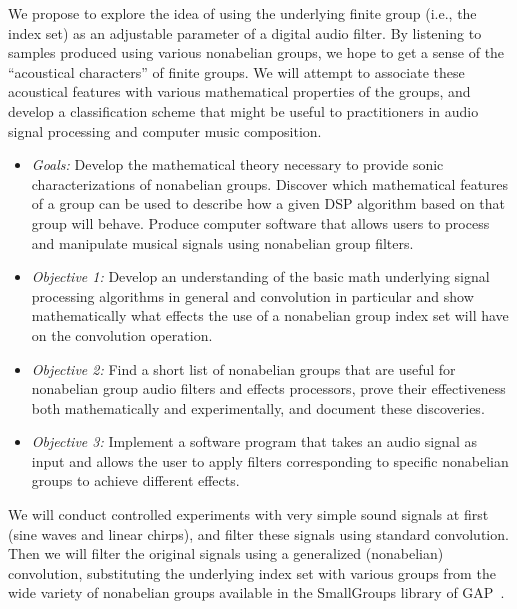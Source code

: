 \documentclass[11pt]{article}
\begin{document}
\vskip5mm


We propose to explore the idea of using the underlying finite group (i.e., the
index set) as an adjustable parameter of a digital audio filter.  By listening to
samples produced using various nonabelian groups, we hope to get a sense of the
``acoustical characters'' of finite groups.  We will attempt to associate these
acoustical features with various mathematical properties of the groups, and
develop a classification scheme that might be useful to
practitioners in audio signal processing and computer music composition.

\begin{itemize}
\item {\it Goals:}
Develop the mathematical theory necessary to provide sonic characterizations of
nonabelian groups. Discover which mathematical features of a group can be used to
describe how a given \ac{DSP} algorithm based on that group will behave. 
Produce computer software that allows users to process and manipulate musical
signals using nonabelian group filters.
\item 
{\it Objective 1:} Develop an understanding of the basic math underlying signal
processing algorithms in general and convolution in particular and show
mathematically what effects the use of a nonabelian group index set will have
on the convolution operation.
\item
{\it Objective 2:} Find a short list of nonabelian groups that are useful for
nonabelian group audio filters and effects processors, prove their effectiveness
both mathematically and experimentally, and document these discoveries.
\item
{\it Objective 3:} Implement a software program that takes an audio signal as input and
allows the user to apply filters corresponding to specific nonabelian groups to
achieve different effects. 
\end{itemize}

 
\vskip5mm

We will conduct controlled experiments with very simple sound signals at first
(sine waves and linear chirps), and filter these signals using
standard convolution.  Then we will filter the original signals using a
generalized (nonabelian) convolution, substituting the underlying index set with
various groups from the wide variety of nonabelian groups available in 
the SmallGroups library of \acs{GAP}~\cite{GAP4}.   
\end{document}

